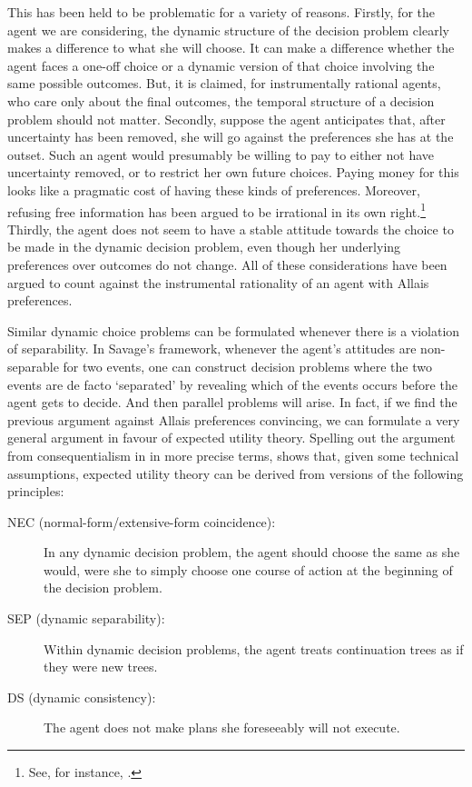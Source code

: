 This has been held to be problematic for a variety of reasons. Firstly, for the agent we are considering, the dynamic structure of the decision problem clearly makes a difference to what she will choose. It can make a difference whether the agent faces a one-off choice or a dynamic version of that choice involving the same possible outcomes. But, it is claimed, for instrumentally rational agents, who care only about the final outcomes, the temporal structure of a decision problem should not matter. Secondly, suppose the agent anticipates that, after uncertainty has been removed, she will go against the preferences she has at the outset. Such an agent would presumably be willing to pay to either not have uncertainty removed, or to restrict her own future choices. Paying money for this looks like a pragmatic cost of having these kinds of preferences. Moreover, refusing free information has been argued to be irrational in its own right.\footnote{See, for instance, \citet{Wakker1988}.} Thirdly, the agent does not seem to have a stable attitude towards the choice to be made in the dynamic decision problem, even though her underlying preferences over outcomes do not change. All of these considerations have been argued to count against the instrumental rationality of an agent with Allais preferences.

Similar dynamic choice problems can be formulated whenever there is a violation of separability. In Savage's framework, whenever the agent's attitudes are non-separable for two events, one can construct decision problems where the two events are de facto `separated' by revealing which of the events occurs before the agent gets to decide. And then parallel problems will arise. In fact, if we find the previous argument against Allais preferences convincing, we can formulate a very general argument in favour of expected utility theory. Spelling out the argument from consequentialism in \citet{Hammond1988} in more precise terms, \citet{McClennen1990} shows that, given some technical assumptions, expected utility theory can be derived from versions of the following principles:
\begin{description}
\item[NEC (normal-form/extensive-form coincidence):] In any dyn\-amic decision problem, the agent should choose the same as she would, were she to simply choose one course of action at the beginning of the decision problem.
\item[SEP (dynamic separability):] Within dynamic decision problems, the agent treats continuation trees as if they were new trees.
\item[DS (dynamic consistency):] The agent does not make plans she foreseeably will not execute.
\end{description}

